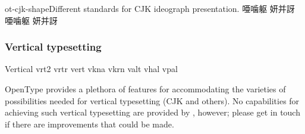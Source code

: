 \documentclass[a4paper]{l3doc}
\begin{document}
\begin{Xexample}[firstline=2]{ot-cjk-shape}{Different standards for CJK ideograph presentation.}
  \LARGE\def\text{\noindent 唖噛躯 妍并訝}
  {
  \text }                          \\
  {
  \text }                          
\end{Xexample}


\subsubsection{Vertical typesetting}

\begin{features}{Vertical}
         {vrt2}
 {vrtr}
            {vert}
        {vkna}
               {vkrn}
      {valt}
           {vhal}
   {vpal}
\end{features}

OpenType provides a plethora of features for accommodating the varieties of possibilities
needed for vertical typesetting (CJK and others).
No capabilities for achieving such vertical typesetting are provided by ,
however; please get in touch if there are improvements that could be made.
\end{document}
